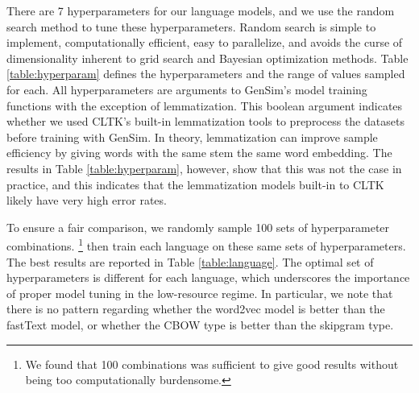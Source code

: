 \documentclass[11pt,a4paper]{article}
\begin{document}
There are 7 hyperparameters for our language models,
and we use the random search method \citep{bergstra2012random} to tune these hyperparameters.
Random search is simple to implement, computationally efficient, easy to parallelize, and avoids the curse of dimensionality inherent to grid search and Bayesian optimization methods.
Table \ref{table:hyperparam} defines the hyperparameters and the range of values sampled for each.
All hyperparameters are arguments to GenSim's model training functions with the exception of lemmatization.
This boolean argument indicates whether we used CLTK's built-in lemmatization tools to preprocess the datasets before training with GenSim.
In theory, lemmatization can improve sample efficiency by giving words with the same stem the same word embedding.
The results in Table \ref{table:hyperparam}, however, show that this was not the case in practice,
and this indicates that the lemmatization models built-in to CLTK likely have very high error rates.


To ensure a fair comparison,
we randomly sample 100 sets of hyperparameter combinations.%
\footnote{We found that 100 combinations was sufficient to give good results without being too computationally burdensome.}
then train each language on these same sets of hyperparameters.
The best results are reported in Table \ref{table:language}.
The optimal set of hyperparameters is different for each language,
which underscores the importance of proper model tuning in the low-resource regime.
In particular, we note that there is no pattern regarding whether the word2vec model is better than the fastText model, or whether the CBOW type is better than the skipgram type.
\end{document}
